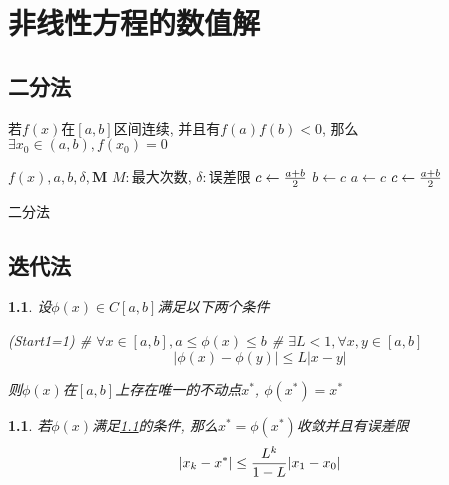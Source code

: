 \chapter{非线性方程的数值解}

\section{二分法}

若$f(x)$在$[a,b]$区间连续, 并且有$f(a)f(b) < 0$, 那么$\exists x_0\in(a,b), f(x_0) = 0$

\begin{algorithm}
\begin{algorithmic}[1]
    \Input $f(x), a, b, \delta, \mathbf{M}$ \Comment $M:$最大次数, $\delta:$误差限 \EndInput
    \State $c \gets {a + b\over 2}$
            \State {}
            \State $b\gets c$
        \Else
            \State $a\gets c$
        \EndIf
        \State $c \gets {a + b\over 2}$
    \EndFor
    \State {}
\end{algorithmic}
\caption{二分法}
\end{algorithm}

\section{迭代法}
\newtheorem{uniqueness_of_root}[theorem_root]{\theorem}
\begin{uniqueness_of_root}
    \label{theorem:uniqueness}
    设$\phi(x)\in C[a,b]$满足以下两个条件
    \begin{easylist}
        \ListProperties(Start1=1)
        # $\forall x\in[a,b], a\le\phi(x)\le b$
        # $\exists L < 1, \forall x,y\in[a,b]$
          $$|\phi(x) - \phi(y)| \le L|x-y|$$
    \end{easylist}
    则$\phi(x)$在$[a,b]$上存在唯一的不动点$x^\ast$, $\phi(x^\ast) = x^\ast$
\end{uniqueness_of_root}

\newtheorem{convergence_of_iterative}[theorem_root]{\theorem}
\begin{convergence_of_iterative}
    若$\phi(x)$满足\ref{theorem:uniqueness}的条件, 那么$x^\ast = \phi(x^\ast)$收敛并且有误差限
    $$|x_k - x^\ast | \le {L^k\over 1-L}|x_1-x_0|$$
\end{convergence_of_iterative}


